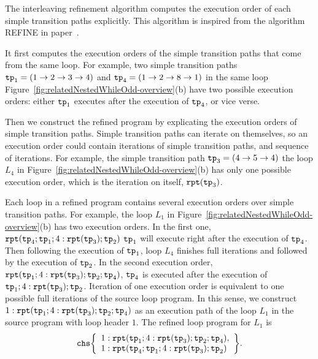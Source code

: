 The interleaving refinement algorithm computes the execution order of each simple transition paths explicitly.
This algorithm is inspired from the algorithm REFINE in paper~\cite{GulwaniJK09}. 

It first computes the execution orders of
the simple transition paths that come from the same loop.
For example, two simple transition paths $\mathtt{tp}_1 = (1 \to 2 \to 3 \to 4)$ and 
$\mathtt{tp}_4 = (1 \to 2 \to 8 \to 1)$ in the same loop Figure~\ref{fig:relatedNestedWhileOdd-overview}(b) have two possible execution orders:
either $\mathtt{tp}_1$ executes after the execution of $\mathtt{tp}_4$, or vice verse.

Then we construct the refined program by explicating the execution orders of simple transition paths.
Simple transition paths can iterate on themselves, so an execution order could
contain iterations of simple transition paths, and sequence of iterations.
For example, the simple transition path $\mathtt{tp}_3 = (4 \to 5 \to 4)$
the loop $L_4$ in Figure~\ref{fig:relatedNestedWhileOdd-overview}(b) has only one possible execution order,
which is the iteration on itself, $\mathtt{rpt}(\mathtt{tp}_3)$.

Each loop in a refined program contains several execution orders over simple transition paths.
For example, the loop $L_1$ in Figure~\ref{fig:relatedNestedWhileOdd-overview}(b)
has two execution orders. In the first one,
$\mathtt{rpt}(\mathtt{tp}_4; \mathtt{tp}_1; 4:\mathtt{rpt}(\mathtt{tp}_3); \mathtt{tp}_2)$ 
$\mathtt{tp}_1$ will execute right after the execution of $\mathtt{tp}_4$.
Then following the execution of $\mathtt{tp}_1$, loop $L_4$ finishes full iterations and followed by the execution of $\mathtt{tp}_2$.
In the second execution order,
$\mathtt{rpt}(\mathtt{tp}_1; 4:\mathtt{rpt}(\mathtt{tp}_3); \mathtt{tp}_2; \mathtt{tp}_4)$,
$\mathtt{tp}_4$ is executed after the execution of $\mathtt{tp}_1; 4:\mathtt{rpt}(\mathtt{tp}_3); \mathtt{tp}_2$.
Iteration of one execution order is equivalent to one possible full iterations of the source loop program.
In this sense, we construct $1: \mathtt{rpt}(\mathtt{tp}_1; 4:\mathtt{rpt}(\mathtt{tp}_3); \mathtt{tp}_2; \mathtt{tp}_4)$ as an execution path of the loop $L_1$ in the source program with loop header $1$.
The refined loop program for $L_1$ is 
\[
\rpchoose{ 
 \begin{array}{l}
 1: \rprepeat(\tpath_1; 4:\rprepeat(\tpath_3); \tpath_2; \tpath_4), \\
 1: \rprepeat(\tpath_4; \tpath_1; 4:\rprepeat(\tpath_3); \tpath_2) 
 \end{array}
 }.
\]

